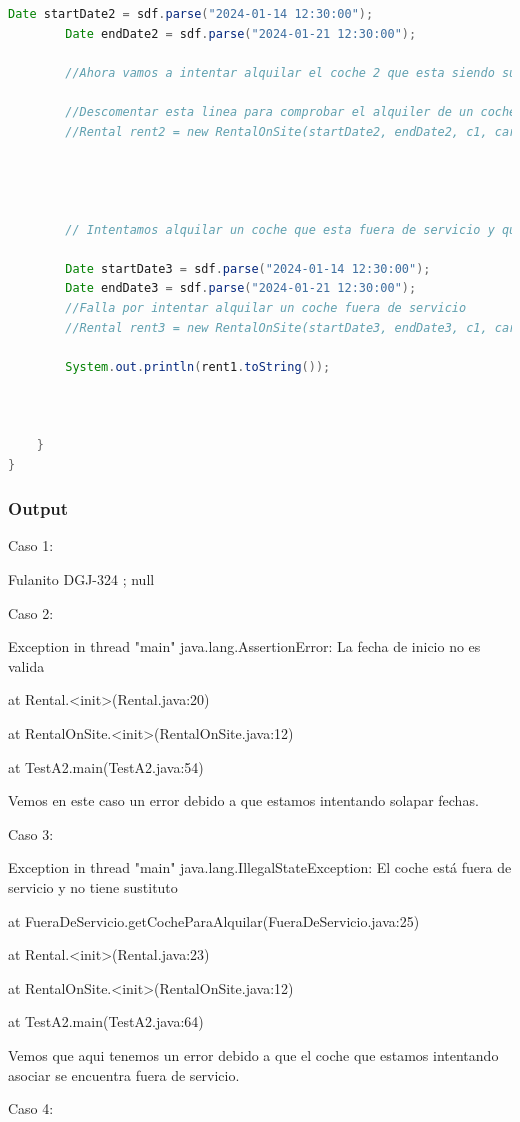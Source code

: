 \begin{lstlisting}[style = javaNormal, language=Java]
        Date startDate2 = sdf.parse("2024-01-14 12:30:00");
        Date endDate2 = sdf.parse("2024-01-21 12:30:00");

        //Ahora vamos a intentar alquilar el coche 2 que esta siendo sustituto del coche 1

        //Descomentar esta linea para comprobar el alquiler de un coche sustituto
        //Rental rent2 = new RentalOnSite(startDate2, endDate2, c1, car2, office1);




        // Intentamos alquilar un coche que esta fuera de servicio y que not tiene sustituto:

        Date startDate3 = sdf.parse("2024-01-14 12:30:00");
        Date endDate3 = sdf.parse("2024-01-21 12:30:00");
        //Falla por intentar alquilar un coche fuera de servicio
        //Rental rent3 = new RentalOnSite(startDate3, endDate3, c1, car3, office1);

        System.out.println(rent1.toString());



    }
}
\end{lstlisting}
\subsubsection*{Output}
Caso 1: \par
\vspace{0.15cm}
Fulanito DGJ-324 ; null\par
\vspace{0.15cm}
Caso 2:\par
\vspace{0.15cm}
Exception in thread "main" java.lang.AssertionError: La fecha de inicio no es valida\par
        at Rental.<init>(Rental.java:20)\par
        at RentalOnSite.<init>(RentalOnSite.java:12)\par
        at TestA2.main(TestA2.java:54)\par
\vspace{0.15cm}
Vemos en este caso un error debido a que estamos intentando solapar fechas.\par
Caso 3:\par
\vspace{0.15cm}
Exception in thread "main" java.lang.IllegalStateException: El coche está fuera de servicio y no tiene sustituto\par
        at FueraDeServicio.getCocheParaAlquilar(FueraDeServicio.java:25)\par
        at Rental.<init>(Rental.java:23)\par
        at RentalOnSite.<init>(RentalOnSite.java:12)\par
        at TestA2.main(TestA2.java:64)\par
        \vspace{0.15cm}
Vemos que aqui tenemos un error debido a que el coche que estamos intentando asociar se encuentra fuera de servicio.\par
Caso 4:\par
\vspace{0.15cm}
     
